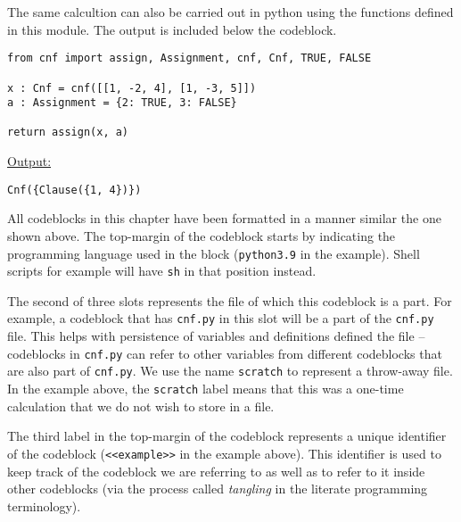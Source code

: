\documentclass[11pt]{article}
\begin{document}
The same calcultion can also be carried out in python using the
functions defined in this module. The output is included below the
codeblock.
\begin{verbatim}
from cnf import assign, Assignment, cnf, Cnf, TRUE, FALSE

x : Cnf = cnf([[1, -2, 4], [1, -3, 5]])
a : Assignment = {2: TRUE, 3: FALSE}

return assign(x, a)
\end{verbatim}

\footnotesize
\uline{Output:}
\begin{verbatim}
Cnf({Clause({1, 4})})
\end{verbatim}
\normalsize

All codeblocks in this chapter have been formatted in a manner similar the one
shown above. The top-margin of the codeblock starts by indicating the
programming language used in the block (\texttt{python3.9} in the example). Shell
scripts for example will have \texttt{sh} in that position instead.

The second of three slots represents the file of which this codeblock is a
part. For example, a codeblock that has \texttt{cnf.py} in this slot will be a part of
the \texttt{cnf.py} file. This helps with persistence of variables and definitions
defined the file -- codeblocks in \texttt{cnf.py} can refer to other variables from
different codeblocks that are also part of \texttt{cnf.py}. We use the name \texttt{scratch}
to represent a throw-away file. In the example above, the \texttt{scratch} label means
that this was a one-time calculation that we do not wish to store in a file.

The third label in the top-margin of the codeblock represents a unique
identifier of the codeblock (\texttt{<<example>>} in the example above). This
identifier is used to keep track of the codeblock we are referring to as well as
to refer to it inside other codeblocks (via the process called \emph{tangling} in the
literate programming terminology).
\end{document}
